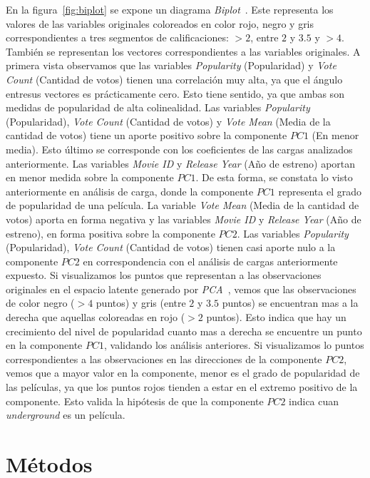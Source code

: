 \documentclass[11pt,a4paper,twoside]{thesis}
\begin{document}
En la figura~\ref{fig:biplot} se expone un diagrama
\textit{Biplot}~\cite{biplot}. Este representa los valores de las variables
originales coloreados en color rojo, negro y gris correspondientes a tres
segmentos de calificaciones: $>2$, entre $2$ y $3.5$ y $>4$. También se
representan los vectores correspondientes a las variables originales. A primera
vista observamos que las variables \textit{Popularity} (Popularidad) y
\textit{Vote Count} (Cantidad de votos) tienen una correlación muy alta, ya que
el ángulo entresus vectores es prácticamente cero. Esto tiene sentido, ya que
ambas son medidas de popularidad de alta colinealidad. Las variables
\textit{Popularity} (Popularidad), \textit{Vote Count} (Cantidad de votos) y
\textit{Vote Mean} (Media de la cantidad de votos) tiene un aporte positivo
sobre la componente $PC1$ (En menor media). Esto último se corresponde con los
coeficientes de las cargas analizados anteriormente. Las variables
\textit{Movie ID} y \textit{Release Year} (Año de estreno) aportan en menor
medida sobre la componente $PC1$. De esta forma, se constata lo visto
anteriormente en análisis de carga, donde la componente $PC1$ representa el
grado de popularidad de una película. La variable \textit{Vote Mean} (Media de
la cantidad de votos) aporta en forma negativa y las variables \textit{Movie ID
} y \textit{Release Year} (Año de estreno), en forma positiva sobre la
componente $PC2$. Las variables \textit{Popularity} (Popularidad), \textit{Vote
	Count} (Cantidad de votos) tienen casi aporte nulo a la componente $PC2$ en
correspondencia con el análisis de cargas anteriormente expuesto. Si
visualizamos los puntos que representan a las observaciones originales en el
espacio latente generado por \textit{PCA}~\cite{pca}, vemos que las
observaciones de color negro ($>4$ puntos) y gris (entre $2$ y $3.5$ puntos) se
encuentran mas a la derecha que aquellas coloreadas en rojo ($>2$ puntos). Esto
indica que hay un crecimiento del nivel de popularidad cuanto mas a derecha se
encuentre un punto en la componente $PC1$, validando los análisis anteriores.
Si visualizamos lo puntos correspondientes a las observaciones en las
direcciones de la componente $PC2$, vemos que a mayor valor en la componente,
menor es el grado de popularidad de las películas, ya que los puntos rojos
tienden a estar en el extremo positivo de la componente. Esto valida la
hipótesis de que la componente $PC2$ indica cuan \textit{underground} es un
película.

\chapter{Métodos}
\end{document}
